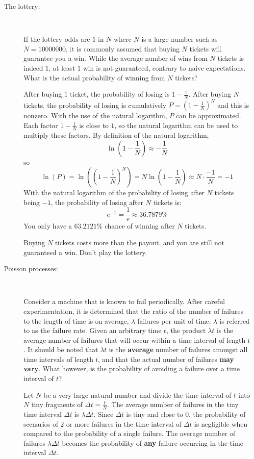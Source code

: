 \documentclass{article}
\begin{document}
\begin{description}
\item[The lottery:] ~ 

If the lottery odds are \(1\) in \(N\) where \(N\) is a large number such as \(N = 10000000\), it is commonly assumed that buying \(N\) tickets will guarantee you a win. While the average number of wins from \(N\) tickets is indeed \(1\), at least \(1\) win is not guaranteed, contrary to naive expectations. What is the actual probability of winning from \(N\) tickets?

After buying \(1\) ticket, the probability of losing is \(1 - \frac{1}{N}\). After buying \(N\) tickets, the probability of losing is cumulatively \(P = \left(1 - \frac{1}{N}\right)^N\) and this is nonzero. With the use of the natural logarithm, \(P\) can be approximated. Each factor \(1 - \frac{1}{N}\) is close to \(1\), so the natural logarithm can be used to multiply these factors. By definition of the natural logarithm, 
\[\ln\left(1 - \frac{1}{N}\right) \approx -\frac{1}{N}\]
so 
\[\ln(P) = \ln\left(\left(1 - \frac{1}{N}\right)^N\right) = N\ln\left(1 - \frac{1}{N}\right) \approx N \cdot \frac{-1}{N} = -1\]
With the natural logarithm of the probability of losing after \(N\) tickets being \(-1\), the probability of losing after \(N\) tickets is: 
\[e^{-1} = \frac{1}{e} \approx 36.7879\%\]
You only have a \(63.2121\%\) chance of winning after \(N\) tickets. 

Buying \(N\) tickets costs more than the payout, and you are still not guaranteed a win. Don't play the lottery. 



\item[Poisson processes:] ~
 
Consider a machine that is known to fail periodically. After careful experimentation, it is determined that the ratio of the number of failures to the length of time is on average, \(\lambda\) failures per unit of time. \(\lambda\) is referred to as the failure rate. Given an arbitrary time \(t\), the product \(\lambda t\) is the average number of failures that will occur within a time interval of length \(t\). It should be noted that \(\lambda t\) is the {\bf average} number of failures amongst all time intervals of length \(t\), and that the actual number of failures {\bf may vary}. What however, is the probability of avoiding a failure over a time interval of \(t\)? 

Let \(N\) be a very large natural number and divide the time interval of \(t\) into \(N\) tiny fragments of \(\Delta t = \frac{t}{N}\). The average number of failures in the tiny time interval \(\Delta t\) is \(\lambda\Delta t\). Since \(\Delta t\) is tiny and close to \(0\), the probability of scenarios of \(2\) or more failures in the time interval of \(\Delta t\) is negligible when compared to the probability of a single failure. The average number of failures \(\lambda\Delta t\) becomes the probability of {\bf any} failure occurring in the time interval \(\Delta t\). 


\end{description}
\end{document}
